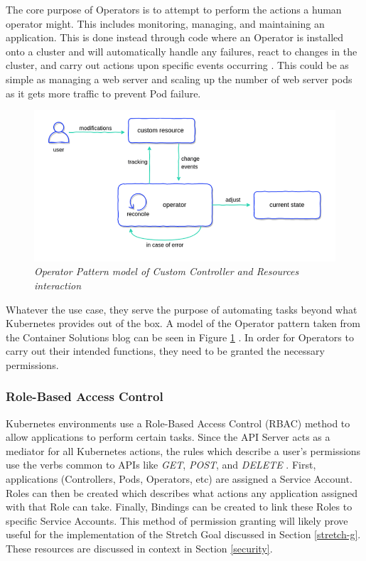 \documentclass{article}
\begin{document}
The core purpose of Operators is to attempt to perform the actions a human operator might. This includes monitoring, managing, and maintaining an application. This is done instead through code where an Operator is installed onto a cluster and will automatically handle any failures, react to changes in the cluster, and carry out actions upon specific events occurring \cite{operator-pattern}. This could be as simple as managing a web server and scaling up the number of web server pods as it gets more traffic to prevent Pod failure.
\begin{figure}[H]
    \centering
    \includegraphics[width=160mm]{tech/operator-pattern.png}
    \caption{\emph{Operator Pattern model of Custom Controller and Resources interaction}}
    \label{op-pat}
\end{figure}

Whatever the use case, they serve the purpose of automating tasks beyond what Kubernetes provides out of the box. A model of the Operator pattern taken from the Container Solutions blog can be seen in Figure \ref{op-pat} \cite{op-pat-blog}. In order for Operators to carry out their intended functions, they need to be granted the necessary permissions.



\subsubsection{Role-Based Access Control}

Kubernetes environments use a Role-Based Access Control (RBAC) method to allow applications to perform certain tasks. Since the API Server acts as a mediator for all Kubernetes actions, the rules which describe a user's permissions use the verbs common to APIs like \emph{GET}, \emph{POST}, and \emph{DELETE} \cite{rbac}. First, applications (Controllers, Pods, Operators, etc) are assigned a Service Account. Roles can then be created which describes what actions any application assigned with that Role can take. Finally, Bindings can be created to link these Roles to specific Service Accounts. This method of permission granting will likely prove useful for the implementation of the Stretch Goal discussed in Section \ref{stretch-g}. These resources are discussed in context in Section \ref{security}.
\end{document}
